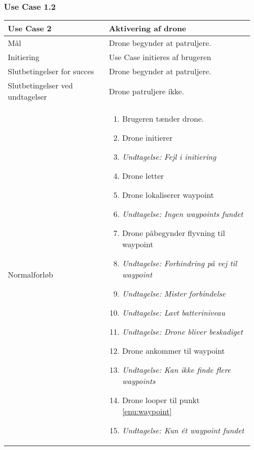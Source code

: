 \documentclass[Main]{subfiles}
\begin{document}
\newpage
\subsubsection{Use Case 1.2}

\begin{longtable}{|p{}|p{}|}
\hline
Use Case 2 	& Aktivering af drone \\ \hline

Mål 		& Drone begynder at patruljere. \\ \hline

Initiering	& Use Case initieres af brugeren \\ \hline

Slutbetingelser for succes & 
Drone begynder at patruljere.  \\ \hline

Slutbetingelser ved undtagelser & 
Drone patruljere ikke. \\ \hline

Normalforløb &	\vspace{-8mm}
	\begin{enumerate}
	\item Brugeren tænder drone.
	\item Drone initierer
	\item[] \textit{Undtagelse: Fejl i initiering}
	\item Drone letter
	\item \label{enu:waypoint} Drone lokaliserer waypoint 
	\item[] \textit{Undtagelse: Ingen waypoints fundet}
	\item \label{enu:flyvning} Drone påbegynder flyvning til waypoint
	\item[] \textit{Undtagelse: Forhindring på vej til waypoint}
	\item[] \textit{Undtagelse: Mister forbindelse}
	\item[] \textit{Undtagelse: Lavt batteriniveau}
	\item[] \textit{Undtagelse: Drone bliver beskadiget}
	\item Drone ankommer til waypoint
	\item[] \textit{Undtagelse: Kan ikke finde flere waypoints}
	\item Drone looper til punkt \ref{enu:waypoint}
	\item[] \textit{Undtagelse: Kun ét waypoint fundet}
	\end{enumerate} \\ \hline


\end{longtable}
\end{document}
